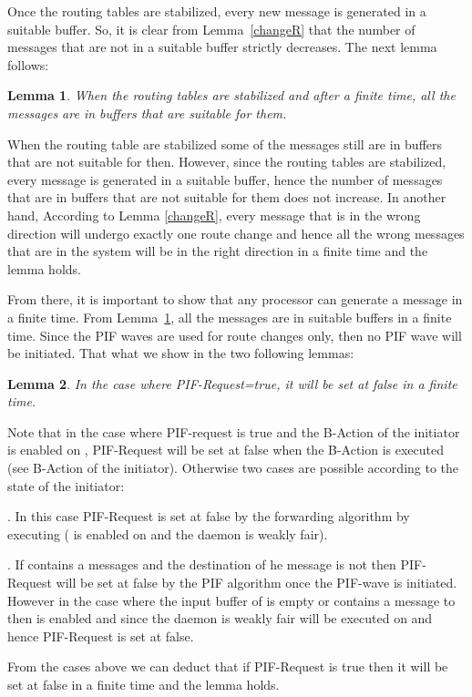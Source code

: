 \documentclass{llncs}
\renewenvironment{proof}{{\it Proof. } }{{\hfill }\vspace{.5pc}}
\newtheorem{lem}{Lemma}
\begin{document}
 Once the routing tables are stabilized, every new message is generated in a suitable buffer.  So, it is clear from Lemma~\ref{changeR} that the number of messages that are not
in a suitable buffer strictly decreases.  The next lemma follows:

\begin{lem}\label{SWBUF}
When the routing tables are stabilized and after a finite time, all the messages are in buffers that are suitable for them.
\end{lem}  

\begin{proof}
When the routing table are stabilized some of the messages still are in buffers that are not suitable for then. However, since the routing tables are stabilized, every message is generated in a suitable buffer, hence the number of 
messages that are in buffers that are not suitable for them does not increase. In another hand, According to Lemma \ref{changeR}, every message that is in the wrong direction will undergo exactly one route change and hence all the wrong messages that are in the system will be in the right direction in a finite time and the lemma holds. 

\end{proof}




 From there, it is important to show that any processor can generate a message in a finite time.  From
Lemma~\ref{SWBUF}, all the messages are in suitable buffers in a finite time.  Since the PIF waves are used for route
changes only, then no PIF wave will be initiated. That what we show in the two following lemmas:

\begin{lem}\label{PIFREQ}
In the case where PIF-Request=true, it will be set at false in a finite time.
\end{lem}  

\begin{proof}
Note that in the case where PIF-request is true and the B-Action of the initiator is enabled on , PIF-Request will be set at false when the B-Action is executed (see B-Action of the initiator). Otherwise two cases are possible according to the state of the initiator:
\begin{itemize}
\item{. In this case PIF-Request is set at false by the forwarding algorithm by executing  ( is enabled on  and the daemon is weakly fair).
\item{}. If  contains a messages and the destination of he message is not  then PIF-Request will be set at false by the PIF algorithm once the PIF-wave is initiated. However in the case where the input buffer of  is empty or contains a message to  then  is enabled and since the daemon is weakly fair  will be executed on  and hence PIF-Request is set at false.}
\end{itemize}
From the cases above we can deduct that if PIF-Request is true then it will be set at false in a finite time and the lemma holds.
\end{proof}
\end{document}
